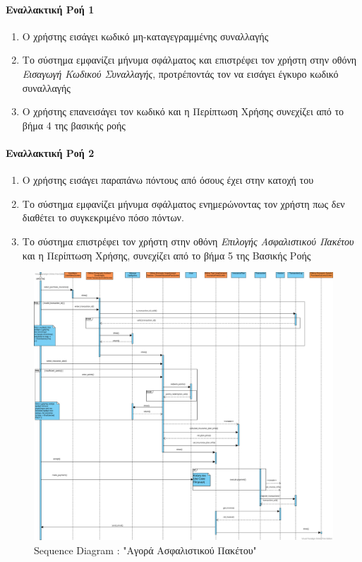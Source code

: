\documentclass{../ol-softwaremanual}
\begin{document}
	\paragraph{Εναλλακτική Ροή 1 }
	
	\begin{enumerate}
		\item Ο χρήστης εισάγει κωδικό μη-καταγεγραμμένης συναλλαγής
		\item Το σύστημα εμφανίζει μήνυμα σφάλματος και επιστρέφει τον χρήστη στην  οθόνη \textit{Εισαγωγή Κωδικού Συναλλαγής}, προτρέποντάς τον να εισάγει έγκυρο κωδικό συναλλαγής
		\item Ο χρήστης επανεισάγει τον κωδικό και η Περίπτωση Χρήσης συνεχίζει από το βήμα 4 της βασικής ροής
	\end{enumerate}
	
	\paragraph{Εναλλακτική Ροή 2}
	\begin{enumerate}
		\item Ο χρήστης εισάγει παραπάνω πόντους από όσους έχει στην κατοχή του
		\item Το σύστημα εμφανίζει μήνυμα σφάλματος ενημερώνοντας τον χρήστη πως δεν διαθέτει το συγκεκριμένο πόσο πόντων.
		\item Το σύστημα επιστρέφει τον χρήστη στην οθόνη \textit{Επιλογής Ασφαλιστικού Πακέτου} και η Περίπτωση Χρήσης, συνεχίζει από το βήμα 5 της Βασικής Ροής
	\end{enumerate}
	
	\begin{figure}[htbp!]
		\centering
		\includegraphics[scale=0.25]{img/seq_purchase_insurance_plan.png}
		\caption{\en Sequence Diagram : "\gr Αγορά Ασφαλιστικού Πακέτου\en"\gr}
	\end{figure}
	
\end{document}
